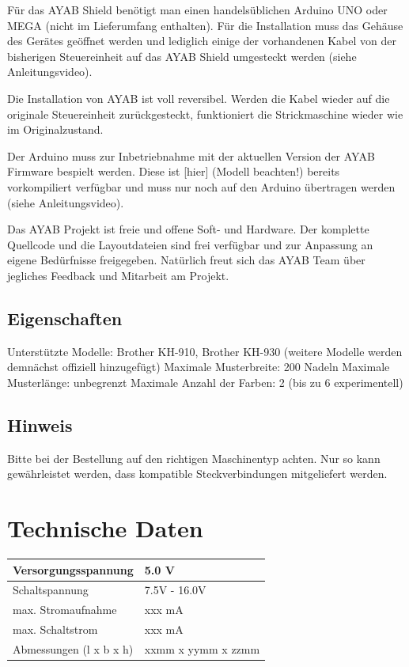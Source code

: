 \documentclass[fleqn,10pt]{SelfArx} %
\begin{document}
Für das AYAB Shield benötigt man einen handelsüblichen Arduino UNO oder MEGA (nicht im Lieferumfang enthalten). Für die Installation muss das Gehäuse des Gerätes geöffnet werden und lediglich einige der vorhandenen Kabel von der bisherigen Steuereinheit auf das AYAB Shield umgesteckt werden (siehe Anleitungsvideo).

Die Installation von AYAB ist voll reversibel. Werden die Kabel wieder auf die originale Steuereinheit zurückgesteckt, funktioniert die Strickmaschine wieder wie im Originalzustand.

Der Arduino muss zur Inbetriebnahme mit der aktuellen Version der AYAB Firmware bespielt werden. Diese ist [hier] (Modell beachten!) bereits vorkompiliert verfügbar und muss nur noch auf den Arduino übertragen werden (siehe Anleitungsvideo).

Das AYAB Projekt ist freie und offene Soft- und Hardware. Der komplette Quellcode und die Layoutdateien sind frei verfügbar und zur Anpassung an eigene Bedürfnisse freigegeben. Natürlich freut sich das AYAB Team über jegliches Feedback und Mitarbeit am Projekt.

 \subsection*{Eigenschaften}

Unterstützte Modelle: Brother KH-910, Brother KH-930 (weitere Modelle werden demnächst offiziell hinzugefügt)
Maximale Musterbreite: 200 Nadeln
Maximale Musterlänge: unbegrenzt
Maximale Anzahl der Farben: 2 (bis zu 6 experimentell)

 \subsection*{Hinweis}

Bitte bei der Bestellung auf den richtigen Maschinentyp achten. Nur so kann gewährleistet werden, dass kompatible Steckverbindungen mitgeliefert werden.


\section{Technische Daten}

\begin{tabular}{ll}
Versorgungsspannung       & 5.0 V              \\ \hline
Schaltspannung            & 7.5V - 16.0V       \\ \hline
max. Stromaufnahme        & xxx mA             \\ \hline
max. Schaltstrom          & xxx mA             \\ \hline
Abmessungen (l x b x h)   & xxmm x yymm x zzmm
\end{tabular}
\end{document}
